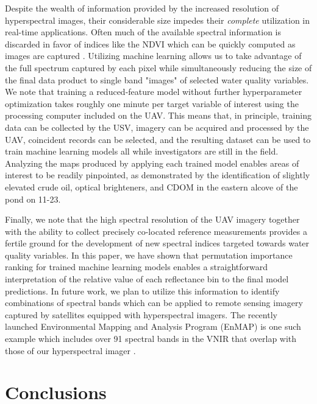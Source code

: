 \documentclass[remotesensing,article,submit,pdftex,moreauthors]{Definitions/mdpi}
\begin{document}
Despite the wealth of information provided by the increased resolution of hyperspectral images, their considerable size impedes their \textit{complete} utilization in real-time applications. Often much of the available spectral information is discarded in favor of indices like the NDVI which can be quickly computed as images are captured \cite{horstrand2019uav}. Utilizing machine learning allows us to take advantage of the full spectrum captured by each pixel while simultaneously reducing the size of the final data product to single band "images" of selected water quality variables. We note that training a reduced-feature model without further hyperparameter optimization takes roughly one minute per target variable of interest using the processing computer included on the UAV. This means that, in principle, training data can be collected by the USV, imagery can be acquired and processed by the UAV, coincident records can be selected, and the resulting dataset can be used to train machine learning models all while investigators are still in the field. Analyzing the maps produced by applying each trained model enables areas of interest to be readily pinpointed, as demonstrated by the identification of slightly elevated crude oil, optical brighteners, and CDOM in the eastern alcove of the pond on 11-23. 

Finally, we note that the high spectral resolution of the UAV imagery together with the ability to collect precisely co-located reference measurements provides a fertile ground for the development of new spectral indices targeted towards water quality variables. In this paper, we have shown that permutation importance ranking for trained machine learning models enables a straightforward interpretation of the relative value of each reflectance bin to the final model predictions. In future work, we plan to utilize this information to identify combinations of spectral bands which can be applied to remote sensing imagery captured by satellites equipped with hyperspectral imagers. The recently launched Environmental Mapping and Analysis Program (EnMAP) is one such example which includes over 91 spectral bands in the VNIR that overlap with those of our hyperspectral imager \cite{Storch2023TheEI}. 


\section{Conclusions}
\end{document}
